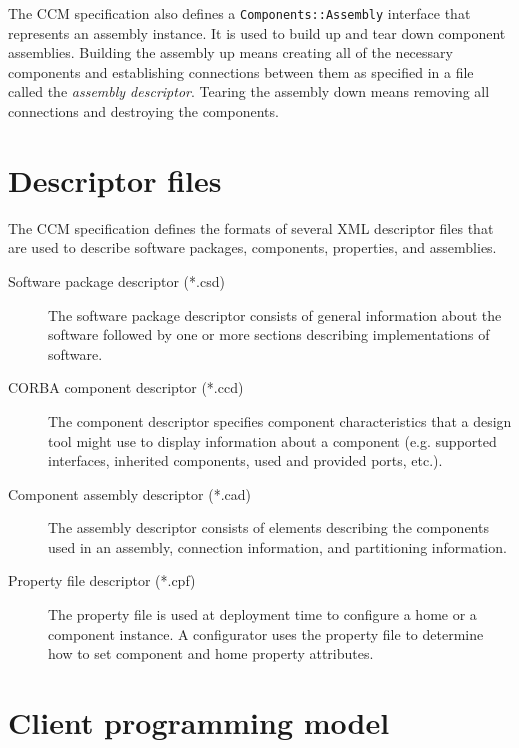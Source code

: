 The CCM specification also defines a {\tt Components::Assembly} interface that
represents an assembly instance. It is used to build up and tear down component
assemblies. Building the assembly up means creating all of the necessary
components and establishing connections between them as specified in a file
called the {\it assembly descriptor\/}. Tearing the assembly down means removing
all connections and destroying the components.

\section{Descriptor files}

The CCM specification defines the formats of several XML descriptor files that
are used to describe software packages, components, properties, and assemblies.

\begin{description}
\item [Software package descriptor (*.csd)]
The software package descriptor consists of general information about the
software followed by one or more sections describing implementations of
software.

\item [CORBA component descriptor (*.ccd)]
The component descriptor specifies component characteristics that a design tool
might use to display information about a component (e.g. supported interfaces,
inherited components, used and provided ports, etc.).

\item [Component assembly descriptor (*.cad)]
The assembly descriptor consists of elements describing the components used in
an assembly, connection information, and partitioning information.

\item [Property file descriptor (*.cpf)]
The property file is used at deployment time to configure a home or a component
instance. A configurator uses the property file to determine how to set
component and home property attributes.
\end{description}

\section{Client programming model}

